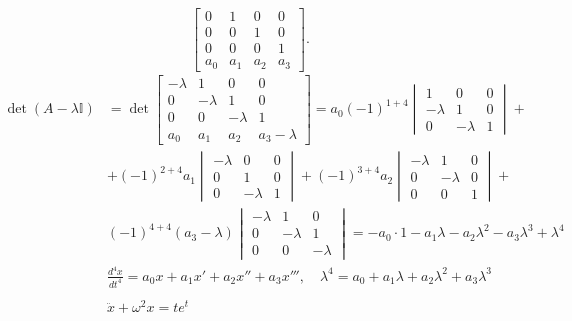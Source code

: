 \documentclass[../main.tex]{subfiles}
\begin{document}
        \begin{przyklad}
            \[
                \begin{bmatrix} 0&1&0&0\\ 0&0&1&0\\ 0&0&0&1\\ a_0&a_1&a_2&a_3 \end{bmatrix}
            .\]
            \begin{align*}
                \det(A - \lambda \mathbb{I}) &= \det \begin{bmatrix} -\lambda & 1 & 0 & 0\\ 0 &-\lambda&1&0\\ 0&0&-\lambda&1\\ a_0&a_1&a_2&a_3-\lambda \end{bmatrix} = a_0(-1)^{1+4} \begin{vmatrix} 1&0&0\\-\lambda&1&0\\0&-\lambda&1 \end{vmatrix} + \\
                    &+ (-1)^{2+4} a_1 \begin{vmatrix} -\lambda&0&0\\0&1&0\\0&-\lambda&1 \end{vmatrix} + (-1)^{3+4}a_2\begin{vmatrix} -\lambda&1&0\\0&-\lambda&0\\0&0&1 \end{vmatrix} + \\
                    &(-1)^{4+4}(a_3-\lambda)\begin{vmatrix} -\lambda&1&0\\0&-\lambda&1\\0&0&-\lambda \end{vmatrix} = -a_0 \cdot 1 - a_1\lambda - a_2\lambda^2 - a_3\lambda^3 + \lambda^4\\
                &\frac{d^4x}{dt^4} = a_0x + a_1x' + a_2x'' + a_3x''',\quad \lambda^4 = a_0+a_1\lambda+a_2\lambda^2+a_3\lambda^3\\
                \\
                &\ddot{x} + \omega^2 x = te^{t}\\

\end{align*}
\end{przyklad}
\end{document}
